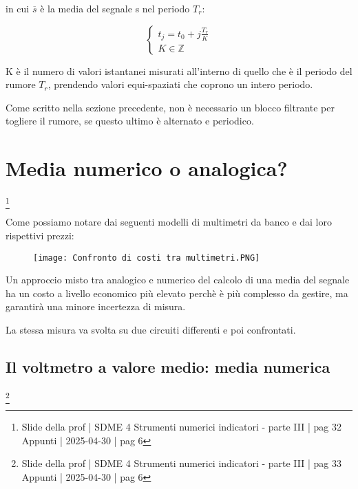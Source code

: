 in cui $\overline{s}$ è la media del segnale s nel periodo $T_r$:

{
    \Large 
    \begin{equation}
        \begin{cases}
            t_j = t_0 + j \frac{T_r}{K}
            \\ 
            K \in \mathbb{Z} 
        \end{cases}
    \end{equation}
}

K è il numero di valori istantanei misurati all'interno di quello che è il periodo del rumore $T_r$, 
prendendo valori equi-spaziati che coprono un intero periodo. \newline 

Come scritto nella sezione precedente, non è necessario un blocco filtrante per togliere il rumore, 
se questo ultimo è alternato e periodico. \newline 

\newpage 

\section{Media numerico o analogica?}
\footnote{Slide della prof | SDME 4 Strumenti numerici indicatori - parte III | pag  32 \\  
Appunti | 2025-04-30 | pag 6}

Come possiamo notare dai seguenti modelli di multimetri da banco e dai loro rispettivi prezzi:

\begin{figure}[h]
    \centering
    \texttt{[image: Confronto di costi tra multimetri.PNG]}
\end{figure} 

Un approccio misto tra analogico e numerico del calcolo di una media del segnale ha un costo a livello economico più elevato 
perchè è più complesso da gestire, ma garantirà una minore incertezza di misura. \newline 

La stessa misura va svolta su due circuiti differenti e poi confrontati. \newline 

\newpage 

\subsection{Il voltmetro a valore medio: media numerica}
\footnote{Slide della prof | SDME 4 Strumenti numerici indicatori - parte III | pag  33\\  
Appunti | 2025-04-30 | pag 6}

